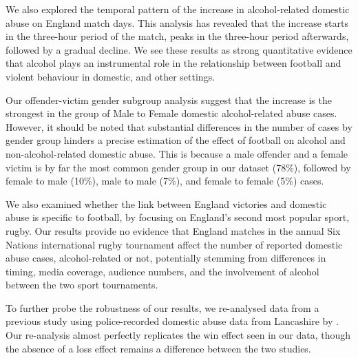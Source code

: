 \documentclass[12pt, a4paper]{article}
\begin{document}
We also explored the temporal pattern of the increase in alcohol-related domestic abuse on England match days. This analysis has revealed that the increase starts in the three-hour period of the match, peaks in the three-hour period afterwards, followed by a gradual decline. We see these results as strong quantitative evidence that alcohol plays an instrumental role in the relationship between football and violent behaviour in domestic, and other settings.










 Our offender-victim gender subgroup analysis suggest that the increase is the strongest in the group of Male to Female domestic alcohol-related abuse cases. However, it should be noted that substantial differences in the number of cases by gender group hinders a precise estimation of the effect of football on alcohol and non-alcohol-related domestic abuse. This is because a male offender and a female victim is by far the most common gender group in our dataset (78\%), followed by female to male (10\%), male to male (7\%), and female to female (5\%) cases.


We also examined whether the link between England victories and domestic abuse is specific to football, by focusing on England's second most popular sport, rugby. Our results provide no evidence that England matches in the annual Six Nations international rugby tournament affect the number of reported domestic abuse cases, alcohol-related or not, potentially stemming from differences in timing, media coverage, audience numbers, and the involvement of alcohol between the two sport tournaments.

To further probe the robustness of our results, we re-analysed data from a previous study using police-recorded domestic abuse data from Lancashire by . Our re-analysis almost perfectly replicates the win effect seen in our data, though the absence of a loss effect remains a difference between the two studies.
\end{document}
